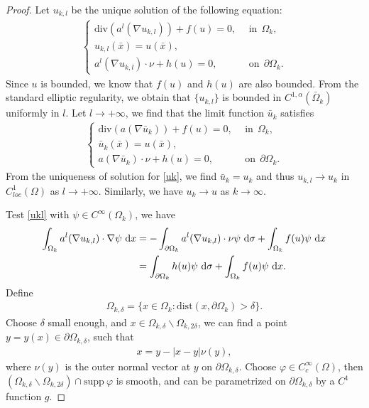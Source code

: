 \documentclass[reqno, 11pt]{amsart} %
\numberwithin{equation}{section}
\theoremstyle{definition}
\newcommand{\pa}{\partial}
\newcommand{\dx}{\textup{d}x}
\begin{document}
\begin{proof}
      Let $u_{k,l}$ be the unique solution of the following equation:
    \begin{align}\label{ukl}
        \begin{cases}
            \text{div} (a^l(\nabla u_{k,l})) + f(u) = 0, \ \ & \text{in} \ \ \Omega_k,  \\
            u_{k,l}(\bar{x}) = u(\bar{x}), \\
            a^l(\nabla u_{k,l}) \cdot \nu + h(u) =0, \ \ &\text{on} \ \ \pa \Omega_k.
        \end{cases}
    \end{align}
    Since $u$ is bounded, we know that $f(u)$ and $h(u)$ are also bounded. From the standard elliptic regularity, we obtain that $\{u_{k,l}\}$ is bounded in $C^{1,\alpha}(\bar{\Omega}_k)$ uniformly in $l$. Let $ l \to +\infty$, we find that the limit function $\bar{u}_k$ satisfies
    \begin{align*}
        \begin{cases}
            \text{div} (a(\nabla \bar{u}_k )) + f(u) = 0, \ \ & \text{in} \ \ \Omega_k, \\
            \bar{u}_k(\bar{x}) = u(\bar{x}), \\
            a(\nabla \bar{u}_k) \cdot \nu + h(u) = 0, \ \ & \text{on} \ \ \pa \Omega_k.
        \end{cases}
    \end{align*}
    From the uniqueness of solution for \eqref{uk}, we find $\bar{u}_k = u_k$ and thus $u_{k,l} \to u_k$ in $C_{loc}^{1}(\Omega)$ as $l \to +\infty$. Similarly, we have $u_k \to u$ as $k \to \infty$.

    Test \eqref{ukl} with $ \psi \in C^{\infty}(\Omega_k)$, we have
    \begin{align}\label{psi-test}
        \int_{\Omega_k} a^l(\nabla u_{k,l}) \cdot \nabla \psi \ \dx & = -  \int_{\pa \Omega_k} a^l(\nabla u_{k,l}) \cdot \nu \psi \ \text{d} \sigma + \int_{\Omega_k} f(u) \psi \ \dx \\
         & = \int_{\pa \Omega_k} h(u) \psi \ \text{d} \sigma + \int_{\Omega_k} f(u) \psi \ \dx.  \nonumber
    \end{align}
    Define
    \begin{align*}
        \Omega_{k, \delta} = \{ x \in \Omega_k: \text{dist}(x, \pa \Omega_k) > \delta\}.
    \end{align*}
    Choose $\delta$ small enough, and $x \in \Omega_{k, \delta} \backslash \Omega_{k, 2\delta}$, we can find a point $y = y(x) \in \pa \Omega_{k,\delta}$, such that
    \begin{align*}
        x = y - |x-y| \nu(y),
    \end{align*}
    where $\nu(y)$ is the outer normal vector at $y$ on $\pa \Omega_{k, \delta}$. Choose $ \varphi \in C_c^{\infty}(\Omega)$, then $(\Omega_{k,\delta} \backslash \Omega_{k,2 \delta}) \cap \text{supp} \ \varphi$ is smooth, and can be parametrized on $\pa \Omega_{k, \delta}$ by a $C^1$ function $g$.


\end{proof}
\end{document}
